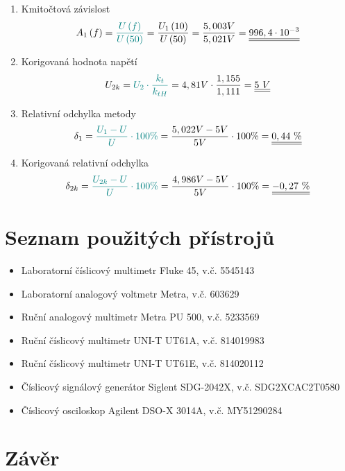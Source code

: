 \documentclass[a4paper, czech]{article}
\begin{document}
\begin{enumerate}
    \item Kmitočtová závislost
    \begin{multline*}
        A_1 \left(f\right) = \textcolor{teal}{\frac{U \left(f\right)}{U \left(50\right)}} = \frac{U_1 \left(10\right)}{U \left(50\right)} = \frac{5,003V}{5,021V} = \underline{\underline{996,4 \cdot 10^{-3}}} \hfill
    \end{multline*}
    \item Korigovaná hodnota napětí
    \begin{multline*}
        U_{2k} = \textcolor{teal}{U_2 \cdot \frac{k_t}{k_{tH}}} = 4,81V \cdot \frac{1,155}{1,111} = \underline{\underline{5\ V}} \hfill
    \end{multline*}
    \item Relativní odchylka metody
    \begin{multline*}
        \delta_1 = \textcolor{teal}{\frac{U_1 - U}{U} \cdot 100\%} = \frac{5,022V - 5V}{5V} \cdot 100 \% = \underline{\underline{0,44\ \%}} \hfill
    \end{multline*}
    \item Korigovaná relativní odchylka
    \begin{multline*}
        \delta_{2k} = \textcolor{teal}{\frac{U_{2k} - U}{U} \cdot 100\%} = \frac{4,986 V - 5V}{5V} \cdot 100 \% = \underline{\underline{-0,27\ \%}} \hfill
    \end{multline*}
\end{enumerate}

\section{Seznam použitých přístrojů}

\begin{itemize}
    \item Laboratorní číslicový multimetr Fluke 45, v.č. 5545143
    \item Laboratorní analogový voltmetr Metra, v.č. 603629
    \item Ruční analogový multimetr Metra PU 500, v.č. 5233569
    \item Ruční číslicový multimetr UNI-T UT61A, v.č. 814019983
    \item Ruční číslicový multimetr UNI-T UT61E, v.č. 814020112
    \item Číslicový signálový generátor Siglent SDG-2042X, v.č. SDG2XCAC2T0580
    \item Číslicový osciloskop Agilent DSO-X 3014A, v.č. MY51290284
\end{itemize}

\section{Závěr}
\end{document}

